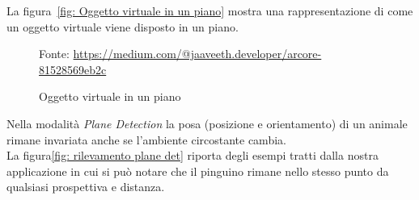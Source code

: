 \documentclass[crop=false, class=book]{standalone}
\begin{document}
	\clearpage
		\noindent
		La figura~\vref{fig: Oggetto virtuale in un piano} mostra una rappresentazione di come un oggetto virtuale viene disposto in un piano.
		\begin{figure}
			\centering
			{Fonte: \url{https://medium.com/@jaaveeth.developer/arcore-81528569eb2c}}
			\caption{Oggetto virtuale in un piano}
			\label{fig: Oggetto virtuale in un piano}
		\end{figure}	

		\noindent 
		Nella modalità \emph{Plane Detection} la posa (posizione e orientamento) di un animale rimane invariata anche se l'ambiente circostante cambia. 
		\\
		La figura\vref{fig: rilevamento plane det} riporta degli esempi tratti dalla nostra applicazione in cui si può notare che il pinguino rimane nello stesso punto da qualsiasi prospettiva e distanza.
	
\end{document}
